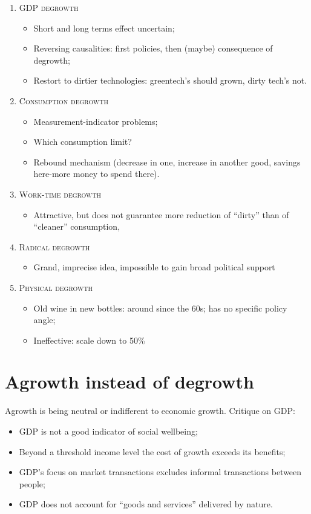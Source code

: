 \begin{enumerate}

\item \textsc{GDP degrowth}
\begin{itemize}
\item Short and long terms effect uncertain;
\item Reversing causalities: first policies, then (maybe) consequence of degrowth;
\item Restort to dirtier technologies: greentech's should grown, dirty tech's not.
\end{itemize}

\item \textsc{Consumption degrowth}
\begin{itemize}
\item Measurement-indicator problems;
\item Which consumption limit?
\item Rebound mechanism (decrease in one, increase in another good, savings here-more money to spend there).
\end{itemize}

\item \textsc{Work-time degrowth}
\begin{itemize}
\item Attractive, but does not guarantee more reduction of “dirty” than of “cleaner” consumption,
\end{itemize}

\item \textsc{Radical degrowth}
\begin{itemize}
\item Grand, imprecise idea, impossible to gain broad political support
\end{itemize}

\item \textsc{Physical degrowth}
\begin{itemize}
\item Old wine in new bottles: around since the 60s; has no specific policy angle;
\item Ineffective: scale down to 50\% 
\end{itemize}

\end{enumerate}

\section*{Agrowth instead of degrowth}
Agrowth is being neutral or indifferent to economic growth. Critique on GDP:
\begin{itemize}
\item GDP is not a good indicator of social wellbeing;
\item Beyond a threshold income level the cost of growth exceeds its benefits;
\item GDP’s focus on market transactions excludes informal transactions between people;
\item GDP does not account for “goods and services” delivered by nature.
\end{itemize}

